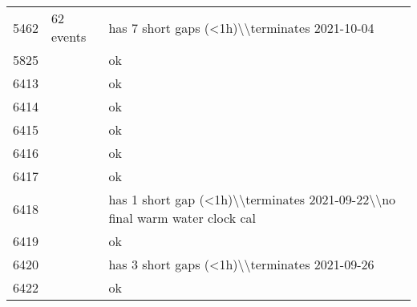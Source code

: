 \begin{longtable}{p{1cm}p{7cm}p{7cm}}
5462 &                                                                       62 events &                                                   has 7 short gaps (<1h)\textbackslash \textbackslash terminates 2021-10-04 \\
5825 &                                                                                 &                                                                                              ok \\
6413 &                                                                                 &                                                                                              ok \\
6414 &                                                                                 &                                                                                              ok \\
6415 &                                                                                 &                                                                                              ok \\
6416 &                                                                                 &                                                                                              ok \\
6417 &                                                                                 &                                                                                              ok \\
6418 &                                                                                 &                     has 1 short gap (<1h)\textbackslash \textbackslash terminates 2021-09-22\textbackslash \textbackslash no final warm water clock cal \\
6419 &                                                                                 &                                                                                              ok \\
6420 &                                                                                 &                                                   has 3 short gaps (<1h)\textbackslash \textbackslash terminates 2021-09-26 \\
6422 &                                                                                 &                                                                                              ok \\

\end{longtable}

